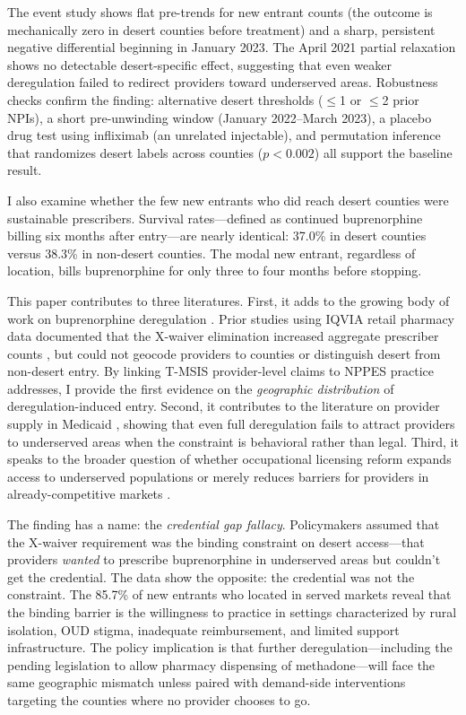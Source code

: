 \documentclass[12pt]{article}
\begin{document}
The event study shows flat pre-trends for new entrant counts (the outcome is mechanically zero in desert counties before treatment) and a sharp, persistent negative differential beginning in January 2023. The April 2021 partial relaxation shows no detectable desert-specific effect, suggesting that even weaker deregulation failed to redirect providers toward underserved areas. Robustness checks confirm the finding: alternative desert thresholds ($\leq$1 or $\leq$2 prior NPIs), a short pre-unwinding window (January 2022--March 2023), a placebo drug test using infliximab (an unrelated injectable), and permutation inference that randomizes desert labels across counties ($p < 0.002$) all support the baseline result.

I also examine whether the few new entrants who did reach desert counties were sustainable prescribers. Survival rates---defined as continued buprenorphine billing six months after entry---are nearly identical: 37.0\% in desert counties versus 38.3\% in non-desert counties. The modal new entrant, regardless of location, bills buprenorphine for only three to four months before stopping.

This paper contributes to three literatures. First, it adds to the growing body of work on buprenorphine deregulation \citep{lembke2024, meinhofer2022, wen2017, jones2015}. Prior studies using IQVIA retail pharmacy data documented that the X-waiver elimination increased aggregate prescriber counts \citep{lembke2024}, but could not geocode providers to counties or distinguish desert from non-desert entry. By linking T-MSIS provider-level claims to NPPES practice addresses, I provide the first evidence on the \textit{geographic distribution} of deregulation-induced entry. Second, it contributes to the literature on provider supply in Medicaid \citep{buchmueller2015, decker2012, alexander2017}, showing that even full deregulation fails to attract providers to underserved areas when the constraint is behavioral rather than legal. Third, it speaks to the broader question of whether occupational licensing reform expands access to underserved populations or merely reduces barriers for providers in already-competitive markets \citep{kleiner2006, thornton2011, anderson2020}.

The finding has a name: the \textit{credential gap fallacy}. Policymakers assumed that the X-waiver requirement was the binding constraint on desert access---that providers \textit{wanted} to prescribe buprenorphine in underserved areas but couldn't get the credential. The data show the opposite: the credential was not the constraint. The 85.7\% of new entrants who located in served markets reveal that the binding barrier is the willingness to practice in settings characterized by rural isolation, OUD stigma, inadequate reimbursement, and limited support infrastructure. The policy implication is that further deregulation---including the pending legislation to allow pharmacy dispensing of methadone---will face the same geographic mismatch unless paired with demand-side interventions targeting the counties where no provider chooses to go.
\end{document}
